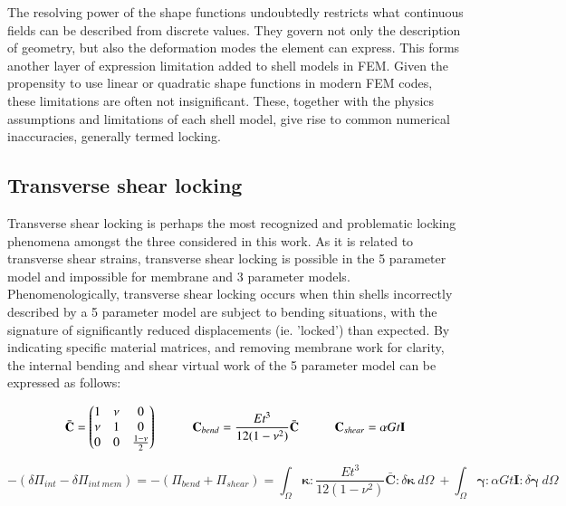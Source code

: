 The resolving power of the shape functions undoubtedly restricts what continuous fields can be described from discrete values. They govern not only the description of geometry, but also the deformation modes the element can express. This forms another layer of expression limitation added to shell models in FEM. Given the propensity to use linear or quadratic shape functions in modern FEM codes, these limitations are often not insignificant. These, together with the physics assumptions and limitations of each shell model, give rise to common numerical inaccuracies, generally termed locking.

\subsection{Transverse shear locking} \label{transverse_shear_locking}

Transverse shear locking is perhaps the most recognized and problematic locking phenomena amongst the three considered in this work. As it is related to transverse shear strains, transverse shear locking is possible  in the 5 parameter model and impossible for membrane and 3 parameter models. Phenomenologically, transverse shear locking occurs when thin shells incorrectly described by a 5 parameter model are subject to bending situations, with the signature of significantly reduced displacements (ie. 'locked') than expected. By indicating specific material matrices, and removing membrane work for clarity, the internal bending and shear virtual work of the 5 parameter model can be expressed as follows: 


\begin{equation} 
\bar{\mathbf{C}} =
\begin{pmatrix}
1 & \nu & 0 \\
\nu & 1 & 0 \\
0 & 0 & \frac{1-\nu}{2}
\end{pmatrix}
\hspace{10mm}
\mathbf{C}_{bend} = \frac{E t^3}{12(1-\nu^2)} \bar{ \mathbf{C}}
\hspace{10mm}
\mathbf{C}_{shear} = \alpha G t \mathbf{I}
\label{eqlock1}
\end{equation}

\begin{equation} 
-( \delta\Pi_{int} - \delta\Pi_{int\ mem} )=
-(\Pi_{bend} + \Pi_{shear}) =
\int_\Omega
\boldsymbol{\kappa}
:
\frac{E t^3}{12(1-\nu^2)} \bar{ \mathbf{C}}
:
\delta \boldsymbol{\kappa}\ 
d \Omega\ 
+
\int_\Omega
\boldsymbol{\gamma}
:
\alpha G t \mathbf{I}
:
\delta \boldsymbol{\gamma}\ 
d \Omega
\label{eqlock2}
\end{equation}



